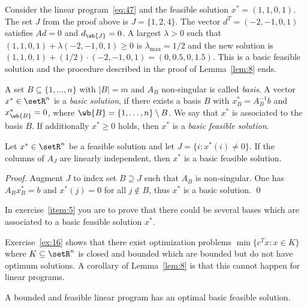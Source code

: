 \begin{example}
  \label{exa:ll}
  Consider the linear program~\eqref{eq:47} and the feasible solution
  $x^* = (1,1,0,1)$. The set $J$ from the proof above is $J =
  \{1,2,4\}$.  The vector $d^T = (-2, -1, 0, 1)$ satisfies $Ad=0$ and
  $d_{\wb{J}} =0$. A largest $\lambda>0$ such that $(1,1,0,1) + \lambda (-2, -1, 0, 1)
  \geq0$ is $\lambda_{\max} = 1/2$ and the new solution is $(1, 1, 0, 1)
  + (1/2)\cdot  (-2, -1, 0, 1) = (0,0.5,0,1.5)$. This is a basic feasible
  solution and the procedure described in the proof of
  Lemma~\ref{lem:8} ends. 
\end{example}



\begin{definition}
  \label{def:13}
   A set $B\subseteq\{1,\ldots,n\}$ with $|B| = m$ and $A_B$ non-singular is
   called \emph{basis}. A vector $x^* \in \setR^n$ is a \emph{basic
     solution}, if there exists a basis $B$ with $x^*_B = A_B^{-1}b$
   and $x^*_{\wb{B}}=0$, where $\wb{B} = \{1,\ldots,n\} \setminus B$. We say that
   $x^*$ is associated to the basis $B$. If
   additionally $x^*\geq0$ holds, then $x^*$ is a \emph{basic feasible
     solution}. 
\end{definition}


  \begin{lemma}
    \label{lem:3} Let  $x^* \in \setR^n$ be a feasible solution and let $J
    = \{ i \colon x^*(i) \neq 
    0\}$. If the columns of $A_J$ are linearly independent, then $x^*$
    is a basic feasible solution.
  \end{lemma}
  \begin{proof}
    Augment $J$ to index set $B\supseteq J$ such that $A_B$ is non-singular.
    One has $A_Bx^*_B=b$ and $x^*(j)=0$ for all $j \notin B$, thus $x^*$
    is a basic solution.  \qed
  \end{proof}
  

In exercise~\ref{item:5} you are to prove that there could be several
bases which are associated to a basic feasible solution $x^*$. 


Exercise~\ref{ex:16} shows that there exist optimization problems
$\min\{c^Tx  \colon x \in K\}$ where $K\subseteq\setR^n$ is closed and bounded which
are bounded but do not have optimum solutions. A corollary of
Lemma~\ref{lem:8} is that this cannot happen for linear programs. 

\begin{corollary}
  \label{co:2}
  A bounded and feasible linear program has an optimal basic feasible
  solution.  
\end{corollary}

